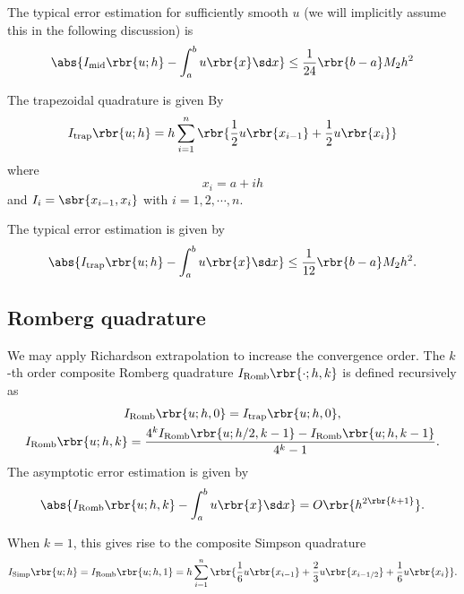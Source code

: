 \documentclass[english, nochinese]{pnote}
\begin{document}
The typical error estimation for sufficiently smooth $u$ (we will implicitly assume this in the following discussion) is
\begin{equation}
\abs{ I_{\text{mid}} \rbr{ u; h } - \int_a^b u \rbr{x} \sd x } \le \frac{1}{24} \rbr{ b - a } M_2 h^2
\end{equation}

The trapezoidal quadrature is given By
\begin{equation}
I_{\text{trap}} \rbr{ u; h } = h \sum_{ i = 1 }^n \rbr{ \frac{1}{2} u \rbr{x_{ i - 1 }} + \frac{1}{2} u \rbr{x_i} }
\end{equation}
where
\begin{equation}
x_i = a + i h 
\end{equation}
and $ I_i = \sbr{ x_{ i - 1 }, x_i } $ with $ i = 1, 2, \cdots, n $.

The typical error estimation is given by
\begin{equation}
\abs{ I_{\text{trap}} \rbr{ u; h } - \int_a^b u \rbr{x} \sd x } \le \frac{1}{12} \rbr{ b - a } M_2 h^2.
\end{equation}

\subsection{Romberg quadrature}

We may apply Richardson extrapolation to increase the convergence order. The $k$-th order composite Romberg quadrature $ I_{\text{Romb}} \rbr{ \cdot; h, k } $ is defined recursively as
\begin{gather}
I_{\text{Romb}} \rbr{ u; h, 0 } = I_{\text{trap}} \rbr{ u; h, 0 }, \\
\label{Eq:RombRec}
I_{\text{Romb}} \rbr{ u; h, k } = \frac{ 4^k I_{\text{Romb}} \rbr{ u; h / 2, k - 1 } - I_{\text{Romb}} \rbr{ u; h, k - 1 } }{ 4^k - 1 }.
\end{gather}
The asymptotic error estimation is given by
\begin{equation}
\abs{ I_{\text{Romb}} \rbr{ u; h, k } - \int_a^b u \rbr{x} \sd x } = O \rbr{h^{ 2 \rbr{ k + 1 }}}.
\end{equation}

When $ k = 1 $, this gives rise to the composite Simpson quadrature
\begin{equation}
I_{\text{Simp}} \rbr{ u; h } = I_{\text{Romb}} \rbr{ u; h, 1 } = h \sum_{ i = 1 }^n \rbr{ \frac{1}{6} u \rbr{x_{ i - 1 }} + \frac{2}{3} u \rbr{x_{ i - 1 / 2 }} + \frac{1}{6} u \rbr{x_i} }.
\end{equation}
\end{document}
